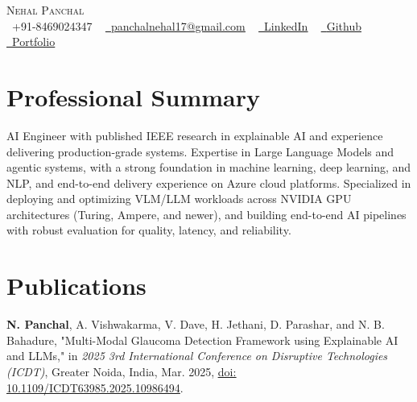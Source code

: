 \documentclass[letterpaper,11pt]{article}
\begin{document}
\begin{center}
  {\Huge \scshape Nehal Panchal} \\ \vspace{5pt}
  \small \raisebox{-0.1\height}\faPhone\ +91-8469024347 ~ \href{mailto:panchalnehal17@gmail.com}{\raisebox{-0.2\height}\faEnvelope\  \underline{panchalnehal17@gmail.com}} ~
  \href{https://www.linkedin.com/in/nehal-panchal-05901b235/}{\raisebox{-0.2\height}\faLinkedin\ \underline{LinkedIn}}  ~
  \href{https://github.com/Nehal04052}{\raisebox{-0.2\height}\faGithub\ \underline{Github}} ~
  \href{https://nehal04052.github.io}{\raisebox{-0.2\height}\faGlobe\ \underline{Portfolio}}
  \vspace{-8pt}
\end{center}

\section{Professional Summary}
AI Engineer with published IEEE research in explainable AI and experience delivering production-grade systems. Expertise in Large Language Models and agentic systems, with a strong foundation in machine learning, deep learning, and NLP, and end-to-end delivery experience on Azure cloud platforms. Specialized in deploying and optimizing VLM/LLM workloads across NVIDIA GPU architectures (Turing, Ampere, and newer), and building end-to-end AI pipelines with robust evaluation for quality, latency, and reliability.

\section{Publications}
\begin{itemize}[leftmargin=0.15in, label={\tiny$\bullet$}]
  \small{
\item \textbf{N. Panchal}, A. Vishwakarma, V. Dave, H. Jethani, D. Parashar, and N. B. Bahadure, "Multi-Modal Glaucoma Detection Framework using Explainable AI and LLMs," in \textit{2025 3rd International Conference on Disruptive Technologies (ICDT)}, Greater Noida, India, Mar. 2025, \href{https://ieeexplore.ieee.org/document/10986494}{\underline{doi: 10.1109/ICDT63985.2025.10986494}}.
  }
\end{itemize}
\vspace{-15pt}

\end{document}

